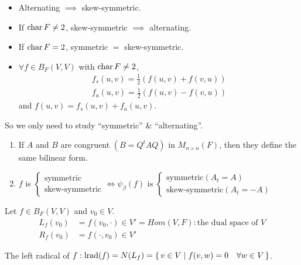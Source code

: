 \begin{remark} \mbox{}
  \begin{itemize}
    \item Alternating $\implies$ skew-symmetric.
    \item If $\operatorname{char} F \ne 2$, skew-symmetric $\implies$ alternating.
    \item If $\operatorname{char} F = 2$, symmetric $=$ skew-symmetric.
    \item $\forall f \in B_F(V, V)$ with $\operatorname{char} F \ne 2$,
      \begin{align*}
        f_s(u, v) = \frac{1}{2}\left(f(u, v) + f(v, u)\right) \\
        f_a(u, v) = \frac{1}{2}\left(f(u, v) - f(v, u)\right)
      \end{align*}
      and $f(u, v) = f_s(u, v) + f_a(u, v)$.
  \end{itemize}
\end{remark}

So we only need to study ``symmetric'' \& ``alternating''.

\begin{exercise} \mbox{}
  \begin{enumerate}
    \item If $A$ and $B$ are congruent $(B = Q^tAQ)$ in $M_{n\times n}(F)$,
      then they define the same bilinear form.
    \item $f$ is
      $\begin{cases}
        \text{symmetric} \\
        \text{skew-symmetric}
      \end{cases} \iff \psi_\beta(f) \text{~is~}
      \begin{cases}
        \text{symmetric} (A_t = A)\\
        \text{skew-symmetric} (A_t = -A)
      \end{cases}$
  \end{enumerate}
\end{exercise}

\begin{observation*}
  Let $f \in B_F(V, V)$ and $v_0 \in V$.
  \begin{align*}
    L_f(v_0) &= f(v_0, \cdot) \in V' = Hom(V, F):
    \text{the dual space of $V$} \\
    R_f(v_0) &= f(\cdot, v_0) \in V'
  \end{align*}
\end{observation*}

The left radical of $f:
\operatorname{lrad}(f) = N(L_f) = \{\, v\in V \mid f(v, w) = 0 \quad \forall w \in V \,\}$.

